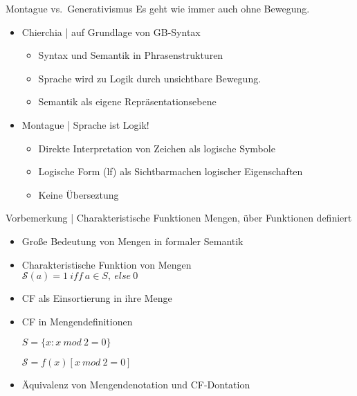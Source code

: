 \begin{frame}
  {Montague vs.\ Generativismus}
  \onslide<+->
  \onslide<+->
  Es geht wie immer auch ohne Bewegung.\\
  \Zeile 
  \begin{itemize}[<+->]
    \item Chierchia | auf Grundlage von GB-Syntax
      \begin{itemize}[<+->]
        \item Syntax und \alert{Semantik in Phrasenstrukturen}
        \item Sprache wird zu Logik durch unsichtbare Bewegung.
        \item Semantik als \alert{eigene Repräsentationsebene}
      \end{itemize}
      \Halbzeile
    \item Montague | \alert{Sprache ist Logik!}
      \begin{itemize}[<+->]
        \item Direkte Interpretation von Zeichen als logische Symbole
        \item Logische Form (lf) als \alert{Sichtbarmachen} logischer Eigenschaften
        \item \alert{Keine Überseztung}
      \end{itemize}
  \end{itemize}
\end{frame}

\begin{frame}
  {Vorbemerkung | Charakteristische Funktionen}
  \onslide<+->
  \onslide<+->
  Mengen, über Funktionen definiert\\
  \Halbzeile
  \begin{itemize}[<+->]
    \item Große Bedeutung von Mengen in formaler Semantik
      \Halbzeile
    \item Charakteristische Funktion von Mengen\\
      \alert{$\mathcal{S}(a) = 1\ iff\ a\in{}S,\ else\ 0$}
    \item CF als Einsortierung in ihre Menge
    \item CF in Mengendefinitionen\\
      \rule{0em}{1em}$S=\{x: x\ mod\ 2=0\}$\\
      \rule{0em}{1em}$\mathcal{S}=f(x)[x\ mod\ 2=0]$\\
      \Halbzeile
    \item \alert{Äquivalenz von Mengendenotation und CF-Dontation}
  \end{itemize}
\end{frame}

